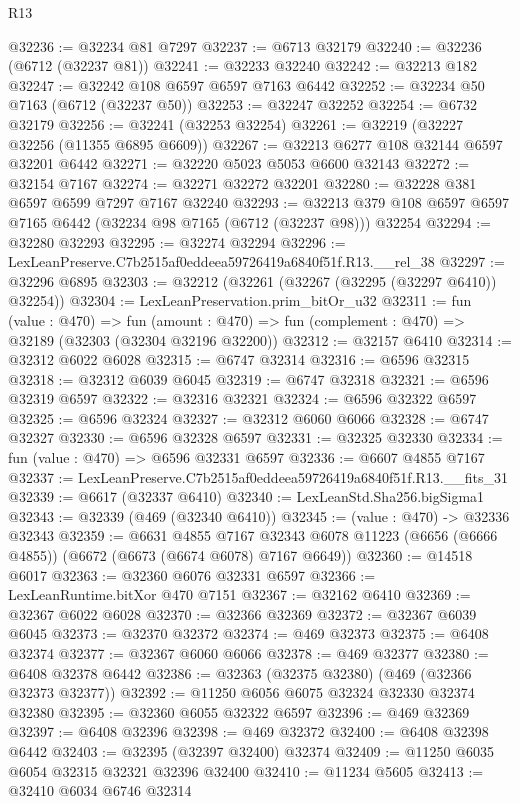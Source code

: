 \begin{lexlean}{R13}
\begin{coremodule}
@32236 := @32234 @81 @7297
@32237 := @6713 @32179
@32240 := @32236 (@6712 (@32237 @81))
@32241 := @32233 @32240
@32242 := @32213 @182
@32247 := @32242 @108 @6597 @6597 @7163 @6442
@32252 := @32234 @50 @7163 (@6712 (@32237 @50))
@32253 := @32247 @32252
@32254 := @6732 @32179
@32256 := @32241 (@32253 @32254)
@32261 := @32219 (@32227 @32256 (@11355 @6895 @6609))
@32267 := @32213 @6277 @108 @32144 @6597 @32201 @6442
@32271 := @32220 @5023 @5053 @6600 @32143
@32272 := @32154 @7167
@32274 := @32271 @32272 @32201
@32280 := @32228 @381 @6597 @6599 @7297 @7167 @32240
@32293 := @32213 @379 @108 @6597 @6597 @7165 @6442 (@32234 @98 @7165 (@6712 (@32237 @98))) @32254
@32294 := @32280 @32293
@32295 := @32274 @32294
@32296 := LexLeanPreserve.C7b2515af0eddeea59726419a6840f51f.R13.__rel_38
@32297 := @32296 @6895
@32303 := @32212 (@32261 (@32267 (@32295 (@32297 @6410)) @32254))
@32304 := LexLeanPreservation.prim_bitOr_u32
@32311 := fun (value : @470) =>
  fun (amount : @470) => fun (complement : @470) => @32189 (@32303 (@32304 @32196 @32200))
@32312 := @32157 @6410
@32314 := @32312 @6022 @6028
@32315 := @6747 @32314
@32316 := @6596 @32315
@32318 := @32312 @6039 @6045
@32319 := @6747 @32318
@32321 := @6596 @32319 @6597
@32322 := @32316 @32321
@32324 := @6596 @32322 @6597
@32325 := @6596 @32324
@32327 := @32312 @6060 @6066
@32328 := @6747 @32327
@32330 := @6596 @32328 @6597
@32331 := @32325 @32330
@32334 := fun (value : @470) => @6596 @32331 @6597
@32336 := @6607 @4855 @7167
@32337 := LexLeanPreserve.C7b2515af0eddeea59726419a6840f51f.R13.__fits_31
@32339 := @6617 (@32337 @6410)
@32340 := LexLeanStd.Sha256.bigSigma1
@32343 := @32339 (@469 (@32340 @6410))
@32345 := (value : @470) -> @32336 @32343
@32359 := @6631
    @4855
    @7167
    @32343
    @6078
    @11223
    (@6656 (@6666 @4855))
    (@6672 (@6673 (@6674 @6078) @7167 @6649))
@32360 := @14518 @6017
@32363 := @32360 @6076 @32331 @6597
@32366 := LexLeanRuntime.bitXor @470 @7151
@32367 := @32162 @6410
@32369 := @32367 @6022 @6028
@32370 := @32366 @32369
@32372 := @32367 @6039 @6045
@32373 := @32370 @32372
@32374 := @469 @32373
@32375 := @6408 @32374
@32377 := @32367 @6060 @6066
@32378 := @469 @32377
@32380 := @6408 @32378 @6442
@32386 := @32363 (@32375 @32380) (@469 (@32366 @32373 @32377))
@32392 := @11250 @6056 @6075 @32324 @32330 @32374 @32380
@32395 := @32360 @6055 @32322 @6597
@32396 := @469 @32369
@32397 := @6408 @32396
@32398 := @469 @32372
@32400 := @6408 @32398 @6442
@32403 := @32395 (@32397 @32400) @32374
@32409 := @11250 @6035 @6054 @32315 @32321 @32396 @32400
@32410 := @11234 @5605
@32413 := @32410 @6034 @6746 @32314

\end{coremodule}
\end{lexlean}
